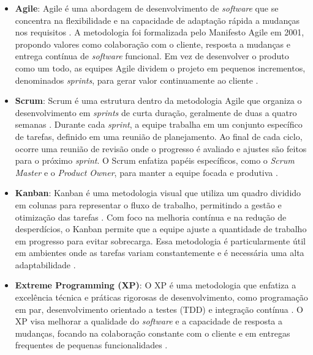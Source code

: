 \begin{itemize} \item \textbf{Agile}: Agile é uma abordagem de desenvolvimento de \textit{software} que se concentra na flexibilidade e na capacidade de adaptação rápida a mudanças nos requisitos \cite{agilemanif}. A metodologia foi formalizada pelo Manifesto Agile em 2001, propondo valores como colaboração com o cliente, resposta a mudanças e entrega contínua de \textit{software} funcional. Em vez de desenvolver o produto como um todo, as equipes Agile dividem o projeto em pequenos incrementos, denominados \textit{sprints}, para gerar valor continuamente ao cliente \cite{agilepractices}.

\item \textbf{Scrum}: Scrum é uma estrutura dentro da metodologia Agile que organiza o desenvolvimento em \textit{sprints} de curta duração, geralmente de duas a quatro semanas \cite{scrumguide}. Durante cada \textit{sprint}, a equipe trabalha em um conjunto específico de tarefas, definido em uma reunião de planejamento. Ao final de cada ciclo, ocorre uma reunião de revisão onde o progresso é avaliado e ajustes são feitos para o próximo \textit{sprint}. O Scrum enfatiza papéis específicos, como o \textit{Scrum Master} e o \textit{Product Owner}, para manter a equipe focada e produtiva \cite{scrumroles}.

\item \textbf{Kanban}: Kanban é uma metodologia visual que utiliza um quadro dividido em colunas para representar o fluxo de trabalho, permitindo a gestão e otimização das tarefas \cite{kanbanmethod}. Com foco na melhoria contínua e na redução de desperdícios, o Kanban permite que a equipe ajuste a quantidade de trabalho em progresso para evitar sobrecarga. Essa metodologia é particularmente útil em ambientes onde as tarefas variam constantemente e é necessária uma alta adaptabilidade \cite{kanbanflow}.

\item \textbf{Extreme Programming (XP)}: O XP é uma metodologia que enfatiza a excelência técnica e práticas rigorosas de desenvolvimento, como programação em par, desenvolvimento orientado a testes (TDD) e integração contínua \cite{extremeprogramming}. O XP visa melhorar a qualidade do \textit{software} e a capacidade de resposta a mudanças, focando na colaboração constante com o cliente e em entregas frequentes de pequenas funcionalidades \cite{tddxp}.

\end{itemize}

